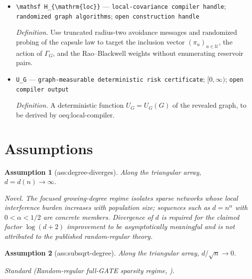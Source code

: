 \documentclass{article}
\newtheorem{assumption}{Assumption}
\begin{document}
\begin{itemize}
  \par\smallskip\noindent\emph{Definition.} The deterministic scale \(r(n,d)=(d+1)^2/[n\log(d+2)]\).
  \item \texttt{\textbackslash{}\allowbreak{}mathsf H\_\allowbreak{}\{\textbackslash{}\allowbreak{}mathrm\{loc\}\allowbreak{}\}\allowbreak{}} --- \texttt{local-\allowbreak{}covariance compiler handle}; \texttt{randomized graph algorithms}; \texttt{open construction handle}
  \par\smallskip\noindent\emph{Definition.} Use truncated radius-two avoidance messages and randomized probing of the capsule law to target the inclusion vector \((\pi_u)_{u\in\mathcal U}\), the action of \(\Gamma_G\), and the Rao--Blackwell weights without enumerating reservoir pairs.
  \item \texttt{U\_\allowbreak{}G} --- \texttt{graph-\allowbreak{}measurable deterministic risk certificate}; \([0,\infty)\); \texttt{open compiler output}
  \par\smallskip\noindent\emph{Definition.} A deterministic function \(U_G=U_G(G)\) of the revealed graph, to be derived by \(\text{oeq:local-compiler}\).
\end{itemize}

\section{Assumptions}

\begin{assumption}[ass:degree-diverges]\label{ass:degree-diverges}
Along the triangular array, \(d=d(n)\to\infty\).
\par\smallskip\noindent\emph{Novel.} The focused growing-degree regime isolates sparse networks whose local interference burden increases with population size; sequences such as \(d=n^\alpha\) with \(0<\alpha<1/2\) are concrete members. Divergence of \(d\) is required for the claimed factor \(\log(d+2)\) improvement to be asymptotically meaningful and is not attributed to the published random-regular theory.
\end{assumption}

\begin{assumption}[ass:subsqrt-degree]\label{ass:subsqrt-degree}
Along the triangular array, \(d/\sqrt n\to0\).
\par\smallskip\noindent\emph{Standard} (Random-regular full-GATE sparsity regime, \cite{KandirosHarshawSavje2026DesignBasedMinimax}).
\end{assumption}
\end{document}

